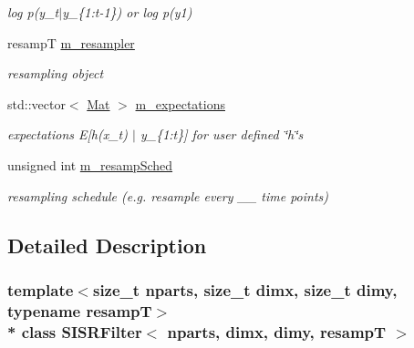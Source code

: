 \begin{DoxyCompactItemize}
\begin{DoxyCompactList}\small\item\em log p(y\+\_\+t$\vert$y\+\_\+\{1\+:t-\/1\}) or log p(y1) \end{DoxyCompactList}\item 
resampT \hyperlink{classSISRFilter_a4f17ee8584202ff44eacc7e6d200009e}{m\+\_\+resampler}\hypertarget{classSISRFilter_a4f17ee8584202ff44eacc7e6d200009e}{}\label{classSISRFilter_a4f17ee8584202ff44eacc7e6d200009e}

\begin{DoxyCompactList}\small\item\em resampling object \end{DoxyCompactList}\item 
std\+::vector$<$ \hyperlink{classSISRFilter_a6563da123e66df0b1140140a5b40d535}{Mat} $>$ \hyperlink{classSISRFilter_a4345a9ab4d85a045dbdf4cbf025b5b6e}{m\+\_\+expectations}\hypertarget{classSISRFilter_a4345a9ab4d85a045dbdf4cbf025b5b6e}{}\label{classSISRFilter_a4345a9ab4d85a045dbdf4cbf025b5b6e}

\begin{DoxyCompactList}\small\item\em expectations E\mbox{[}h(x\+\_\+t) $\vert$ y\+\_\+\{1\+:t\}\mbox{]} for user defined \char`\"{}h\char`\"{}s \end{DoxyCompactList}\item 
unsigned int \hyperlink{classSISRFilter_ad2e239371d0b382a406fd51a7a7c49b4}{m\+\_\+resamp\+Sched}\hypertarget{classSISRFilter_ad2e239371d0b382a406fd51a7a7c49b4}{}\label{classSISRFilter_ad2e239371d0b382a406fd51a7a7c49b4}

\begin{DoxyCompactList}\small\item\em resampling schedule (e.\+g. resample every \+\_\+\+\_\+ time points) \end{DoxyCompactList}\end{DoxyCompactItemize}


\subsection{Detailed Description}
\subsubsection*{template$<$size\+\_\+t nparts, size\+\_\+t dimx, size\+\_\+t dimy, typename resampT$>$\\*
class S\+I\+S\+R\+Filter$<$ nparts, dimx, dimy, resamp\+T $>$}

